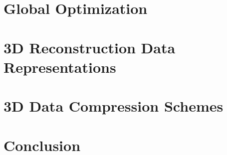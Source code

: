 \section{Global Optimization}


\section{3D Reconstruction Data Representations}

\section{3D Data Compression Schemes}




\section{Conclusion}


